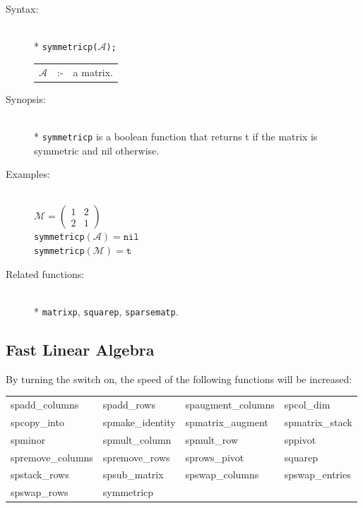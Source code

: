 \begin{description}
\item[Syntax:]\mbox{}\\*
{\tt symmetricp($\mathcal{A}$);}\\[2mm]
\begin{tabular}{l l l}
$\mathcal{A}$ &:-& a matrix.
\end{tabular}

\item[Synopsis:]\mbox{}\\*
\texttt{symmetricp} is a boolean function that returns t if the
                matrix is symmetric and nil otherwise.

\item[Examples:]\mbox{}\\
\(\mathcal{M} = \begin{pmatrix} 1 & 2 \\ 2 & 1 \end{pmatrix}\) \\[2mm]
\texttt{symmetricp}\((\mathcal{A}) = \texttt{nil}\) \\[2mm]
\texttt{symmetricp}\((\mathcal{M}) = \texttt{t}\)

\item[Related functions:]\mbox{}\\*
\texttt{matrixp}, \texttt{squarep}, \texttt{sparsematp}.
\end{description}


\subsection{Fast Linear Algebra}

By turning the  switch on, the speed of the following
functions will be increased:

\begin{tabular}{l l l l}
spadd\_columns    & spadd\_rows      & spaugment\_columns & spcol\_dim  \\
spcopy\_into      & spmake\_identity & spmatrix\_augment  & spmatrix\_stack\\
spminor           & spmult\_column   &  spmult\_row       & sppivot        \\
spremove\_columns & spremove\_rows   & sprows\_pivot      & squarep      \\
spstack\_rows     & spsub\_matrix    & spswap\_columns    & spswap\_entries\\
spswap\_rows      & symmetricp
\end{tabular}

